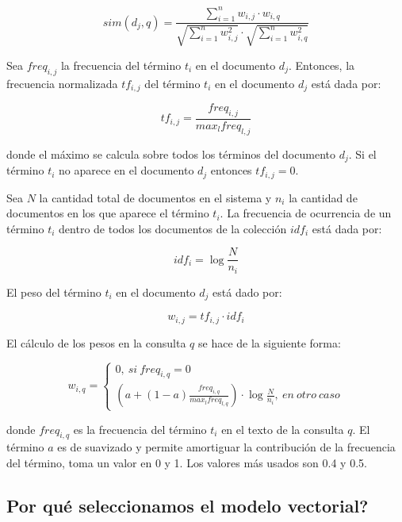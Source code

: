 \documentclass[runningheads]{llncs}
\begin{document}
	\begin{equation}	
		sim(d_j,q)=\frac{\sum_{i=1}^{n}w_{i,j}\cdot w_{i,q}}{\sqrt{\sum_{i=1}^{n}w_{i,j}^2}\cdot\sqrt{\sum_{i=1}^{n}w_{i,q}^2}}
	\end{equation}  

	Sea $freq_{i,j}$ la frecuencia del t\'ermino $t_i$ en el documento $d_j$. Entonces, la frecuencia normalizada $tf_{i,j}$ del t\'ermino $t_i$ en el documento $d_j$ est\'a dada por:
	
	\begin{equation}
		tf_{i,j}=\frac{freq_{i,j}}{max_lfreq_{l,j}}
	\end{equation}

	donde el m\'aximo se calcula sobre todos los t\'erminos del documento $d_j$. Si el t\'ermino $t_i$ no aparece en el documento $d_j$ entonces $tf_{i,j}=0$.
	
	Sea $N$ la cantidad total de documentos en el sistema y $n_i$ la cantidad de documentos en los que aparece el t\'ermino $t_i$. La frecuencia de ocurrencia de un t\'ermino $t_i$ dentro de todos los documentos de la colecci\'on $idf_i$ est\'a dada por:
	
	\begin{equation}
		idf_i=\log \frac{N}{n_i}
	\end{equation}

	El peso del t\'ermino $t_i$ en el documento $d_j$ est\'a dado por:
	
	\begin{equation}
		w_{i,j}=tf_{i,j}\cdot idf_i
	\end{equation}

	El c\'alculo de los pesos en la consulta $q$ se hace de la siguiente forma:
	
	\begin{equation}
		w_{i,q}=\left\{\begin{array}{c}
			0,~si~freq_{i,q}=0\\
			\left(a+(1-a)\frac{freq_{i,q}}{max_lfreq_{l,q}}\right)\cdot\log \frac{N}{n_i},~en~otro~caso
		\end{array}\right. 
	\end{equation}

	donde $freq_{i,q}$ es la frecuencia del t\'ermino $t_i$ en el texto de la consulta $q$. El t\'ermino $a$ es de suavizado y permite amortiguar la contribuci\'on de la frecuencia del t\'ermino, toma un valor en 0 y 1. Los valores m\'as usados son 0.4 y 0.5. 
	
	\subsection{\textquestiondown Por qu\'e seleccionamos el modelo vectorial?}
	
\end{document}
